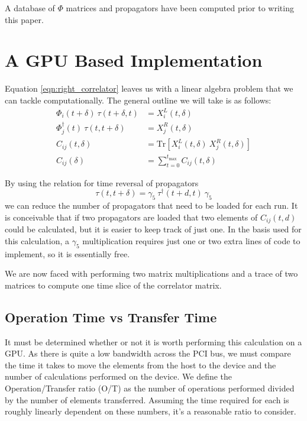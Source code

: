 \documentclass[a4paper,12pt]{report}
\newcommand{\tr}[1]{\textrm{Tr}\left[ #1 \right]}
\begin{document}
A database of $\Phi$ matrices and propagators have been computed prior to writing this paper.





\chapter{A GPU Based Implementation}

Equation \ref{eqn:right_correlator} leaves us with a linear algebra problem that we can tackle computationally.
The general outline we will take is as follows:
%
\begin{align}\label{eqn:correlator_multiply}
	\Phi_i(t+\delta)\ \tau(t+\delta, t) &= X^L_i(t,\delta)\\
	\Phi^\dagger_j(t)\ \tau(t, t+\delta) &= X^R_j(t,\delta)\\
	C_{ij}(t,\delta) &= \tr{X^L_i(t,\delta)\ X^R_j(t,\delta)} \\
	C_{ij}(\delta) &= \sum_{t=0}^{t_{\textrm{max}}} C_{ij}(t,\delta)
\end{align}

By using the relation for time reversal of propagators
%
\begin{equation}\label{eqn:propagator_reversal}
	\tau(t, t+\delta) = \gamma_5\ \tau^\dagger(t+d, t)\ \gamma_5
\end{equation}
%
we can reduce the number of propagators that need to be loaded for each run.
It is conceivable that if two propagators are loaded that two elements of $C_{ij} (t,d)$ could be calculated, but it is easier to keep track of just one.
In the basis used for this calculation, a $\gamma_5$ multiplication requires just one or two extra lines of code to implement, so it is essentially free.

We are now faced with performing two matrix multiplications and a trace of two matrices to compute one time slice of the correlator matrix.


\section{Operation Time vs Transfer Time}
It must be determined whether or not it is worth performing this calculation on a GPU.
As there is quite a low bandwidth across the PCI bus, we must compare the time it takes to move the elements from the host to the device and the number of calculations performed on the device.
We define the Operation/Transfer ratio (O/T) as the number of operations performed divided by the number of elements transferred.
Assuming the time required for each is roughly linearly dependent on these numbers, it's a reasonable ratio to consider.
\end{document}
